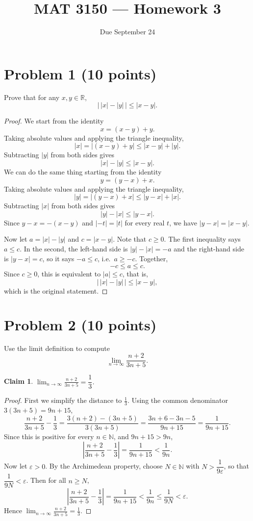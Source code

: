 \documentclass[11pt]{article}
\title{MAT 3150 --- Homework 3}
\author{}
\date{Due September 24}
\newtheorem*{claim}{Claim}
\begin{document}
\maketitle

\section*{Problem 1 (10 points)}
Prove that for any $x,y\in\mathbb{R}$,
\[
  \bigl|\,|x|-|y|\,\bigr| \le |x-y| .
\]

\begin{proof}
We start from the identity
\[
  x = (x-y) + y .
\]
Taking absolute values and applying the triangle inequality,
\[
  |x| = |(x-y)+y| \le |x-y| + |y| .
\]
Subtracting $|y|$ from both sides gives
\[
  |x| - |y| \le |x-y| .
\]
We can do the same thing starting from the identity
\[
  y = (y-x) + x .
\]
Taking absolute values and applying the triangle inequality,
\[
  |y| = |(y-x)+x| \le |y-x| + |x| .
\]
Subtracting $|x|$ from both sides gives
\[
  |y| - |x| \le |y-x| .
\]
Since $y-x = -(x-y)$ and $|-t| = |t|$ for every real $t$, we have
$|y-x| = |x-y|$.

Now let $a = |x|-|y|$ and $c = |x-y|$. Note that $c \ge 0$.
The first inequality says $a \le c$. In the second, the left-hand side is
$|y|-|x| = -a$ and the right-hand side is $|y-x| = c$, so it says
$-a \le c$, i.e.\ $a \ge -c$. Together,
\[
  -c \le a \le c .
\]
Since $c \ge 0$, this is equivalent to $|a| \le c$, that is,
\[
  \bigl|\,|x|-|y|\,\bigr| \le |x-y| ,
\]
which is the original statement.

\end{proof}

\section*{Problem 2 (10 points)}
Use the limit definition to compute
\[
  \lim_{n\to\infty}\frac{n+2}{3n+5}.
\]

\begin{claim}
$\displaystyle\lim_{n\to\infty}\frac{n+2}{3n+5} = \dfrac{1}{3}$.
\end{claim}

\begin{proof}
First we simplify the distance to $\tfrac13$. Using the common
denominator $3(3n+5) = 9n+15$,
\[
  \frac{n+2}{3n+5} - \frac13
  = \frac{3(n+2) - (3n+5)}{3(3n+5)}
  = \frac{3n+6-3n-5}{9n+15}
  = \frac{1}{9n+15}.
\]
Since this is positive for every $n\in\mathbb{N}$, and $9n+15 > 9n$,
\[
  \left|\frac{n+2}{3n+5} - \frac13\right| = \frac{1}{9n+15} < \frac{1}{9n}.
\]
Now let $\varepsilon > 0$. By the Archimedean property, choose
$N \in \mathbb{N}$ with $N > \dfrac{1}{9\varepsilon}$, so that
$\dfrac{1}{9N} < \varepsilon$. Then for all $n \ge N$,
\[
  \left|\frac{n+2}{3n+5} - \frac13\right|
  = \frac{1}{9n+15}
  < \frac{1}{9n}
  \le \frac{1}{9N}
  < \varepsilon .
\]
Hence $\displaystyle\lim_{n\to\infty}\frac{n+2}{3n+5} = \frac13$.

\end{proof}
\end{document}
